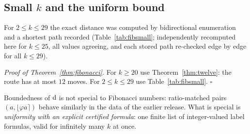 \subsection{Small $k$ and the uniform bound}
For $2\le k\le29$ the exact distance was computed by bidirectional enumeration and a shortest path recorded (Table~\ref{tab:fibsmall}; independently recomputed here for $k\le25$, all values agreeing, and each stored path re-checked edge by edge for all $k\le29$).
\begin{table}[ht]\centering

\caption{Exact $\dist(F_k,F_{k+1})$ for $2\le k\le29$ with a shortest path.}\label{tab:fibsmall}\end{table}
\emph{Proof of Theorem~\ref{thm:fibonacci}.} For $k\ge20$ use Theorem~\ref{thm:twelve}: the route has at most $12$ moves. For $2\le k\le29$ use Table~\ref{tab:fibsmall}. \hfill$\square$
\begin{remark}[Interpretation]
Boundedness of $\operatorname{d}$ is not special to Fibonacci numbers: ratio-matched pairs $(a,\lfloor\varphi a\rceil)$ behave similarly in the data of the earlier release. What is special is \emph{uniformity with an explicit certified formula}: one finite list of integer-valued label formulas, valid for infinitely many $k$ at once.
\end{remark}

